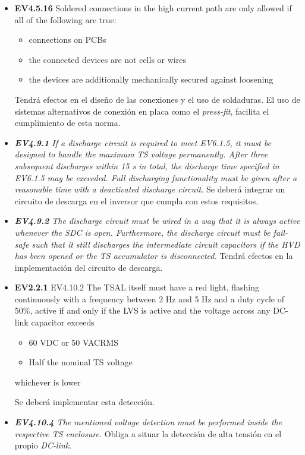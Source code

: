 \begin{itemize}
    \item \begin{em} \textbf{EV4.5.16} Soldered connections in the high current path are only allowed if all of the following are true: 
    \begin{itemize}
            \item connections on PCBs
            \item the connected devices are not cells or wires
            \item the devices are additionally mechanically secured against loosening
    \end{itemize} \end{em} Tendrá efectos en el diseño de las conexiones y el uso de soldaduras. El uso de sistemas alternativos de conexión en placa como el \textit{press-fit}, facilita el cumplimiento de esta norma.
    \item \textit{\textbf{EV4.9.1} If a discharge circuit is required to meet EV6.1.5, it must be designed to handle the maximum TS voltage permanently. After three subsequent discharges within 15 s in total, the discharge time specified in EV6.1.5 may be exceeded.  Full discharging functionality must be given after a reasonable time with a deactivated discharge circuit.} Se deberá integrar un circuito de descarga en el inversor que cumpla con estos requisitos.
    \item \textit{\textbf{EV4.9.2} The discharge circuit must be wired in a way that it is always active whenever the SDC is open. Furthermore, the discharge circuit must be fail-safe such that it still discharges the intermediate circuit capacitors if the HVD has  been opened or the TS accumulator is disconnected.} Tendrá efectos en la implementación del circuito de descarga.
    \item \begin{em} \textbf{EV2.2.1} EV4.10.2 The TSAL itself must have a red light, flashing continuously with a frequency between 2 Hz and 5 Hz and a duty cycle of 50\%, active if and only if the LVS is active and the voltage across any DC-link capacitor exceeds 
    \begin{itemize}
            \item 60 VDC or 50 VACRMS
            \item Half the nominal TS voltage
    \end{itemize} 
    whichever is lower \end{em} Se deberá implementar esta detección.
    \item \textit{\textbf{EV4.10.4} The mentioned voltage detection must be performed inside the respective TS enclosure.} Obliga a situar la detección de alta tensión en el propio \textit{DC-link}.

\end{itemize}

